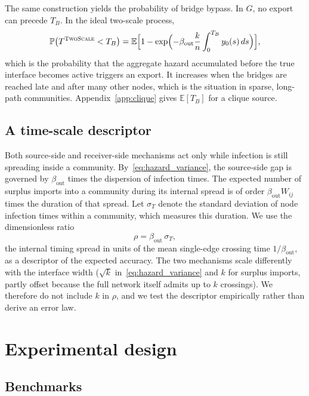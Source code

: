 \documentclass[a4paper,fleqn]{cas-sc}
\newcommand{\TS}{\textup{\textsc{TwoScale}}}
\begin{document}
The same construction yields the probability of bridge bypass. In $G$, no export can precede $T_B$. In the ideal two-scale process,
\begin{equation}
\label{eq:bypass}
\mathbb{P}\bigl(T^{\TS}<T_B\bigr)=\mathbb{E}\Bigl[1-\exp\Bigl(-\beta_{\mathrm{out}}\frac{k}{n}\int_0^{T_B}y_0(s)\,ds\Bigr)\Bigr],
\end{equation}
which is the probability that the aggregate hazard accumulated before the true interface becomes active triggers an export. It increases when the bridges are reached late and after many other nodes, which is the situation in sparse, long-path communities. Appendix~\ref{app:clique} gives $\mathbb{E}[T_B]$ for a clique source.

\subsection{A time-scale descriptor}
\label{sec:descriptor}

Both source-side and receiver-side mechanisms act only while infection is still spreading inside a community. By~\eqref{eq:hazard_variance}, the source-side gap is governed by $\beta_{\mathrm{out}}$ times the dispersion of infection times. The expected number of surplus imports into a community during its internal spread is of order $\beta_{\mathrm{out}}W_{ij}$ times the duration of that spread. Let $\sigma_T$ denote the standard deviation of node infection times within a community, which measures this duration. We use the dimensionless ratio
\begin{equation}
\label{eq:rho}
\rho=\beta_{\mathrm{out}}\,\sigma_T,
\end{equation}
the internal timing spread in units of the mean single-edge crossing time $1/\beta_{\mathrm{out}}$, as a descriptor of the expected accuracy. The two mechanisms scale differently with the interface width ($\sqrt{k}$ in~\eqref{eq:hazard_variance} and $k$ for surplus imports, partly offset because the full network itself admits up to $k$ crossings). We therefore do not include $k$ in $\rho$, and we test the descriptor empirically rather than derive an error law.

\clearpage
\section{Experimental design}
\label{sec:design}

\subsection{Benchmarks}
\end{document}
